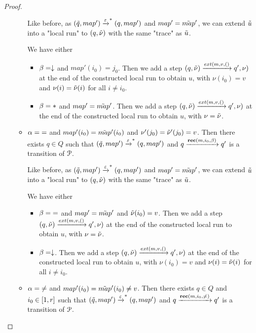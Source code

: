\begin{proof}
\begin{itemize}
\begin{itemize}
			Like before, as $(\Tilde{q}, map') \xrightarrow{\varepsilon}^* (q, map')$ and $map'=\Tilde{map}'$, we can extend $\Tilde{u}$ into a "local run" to $(q, \Tilde{\nu})$ with the same  "trace" as $\Tilde{u}$.
			
			We have either
			\begin{itemize}
				\item $\beta=\downarrow$ and $map'(i_0) = j_0$. Then we add a step $(q, \Tilde{\nu}) \extbr{m,v} (q', \nu)$ at the end of the constructed local run to obtain $u$, with $\nu(i_0)=v$ and $\nu(i) = \Tilde{\nu}(i)$ for all $i \neq i_0$.
				
				\item $\beta={*}$ and $map' = \Tilde{map}'$. Then we add a step $(q, \Tilde{\nu}) \extbr{m,v} (q', \nu)$ at the end of the constructed local run to obtain $u$, with $\nu = \Tilde{\nu}$.
			\end{itemize}
			
			\item $\alpha = {=}$ and $map'(i_0)=\Tilde{map}'(i_0)$ and $\nu'(j_0) = \Tilde{\nu}'(j_0) = v$. Then there exists $q \in Q$ such that $(\Tilde{q}, map') \xrightarrow{\varepsilon}^* (q, map')$ and $q \xrightarrow{\textbf{rec}(m, i_0, \beta)} q'$ is a transition of $\mathcal{P}$.
			
			Like before, as $(\Tilde{q}, map') \xrightarrow{\varepsilon}^* (q, map')$ and $map'=\Tilde{map}'$, we can extend $\Tilde{u}$ into a "local run" to $(q, \Tilde{\nu})$ with the same  "trace" as $\Tilde{u}$.
			
			We have either
			\begin{itemize}
				\item $\beta={=}$ and $map' = \Tilde{map}'$ and $\Tilde{\nu}(i_0) = v$. Then we add a step $(q, \Tilde{\nu}) \extbr{m,v} (q', \nu)$ at the end of the constructed local run to obtain $u$, with $\nu = \Tilde{\nu}$.
				
				\item $\beta=\downarrow$. Then we add a step $(q, \Tilde{\nu}) \extbr{m,v} (q', \nu)$ at the end of the constructed local run to obtain $u$, with $\nu(i_0) = v$ and $\nu(i)=\Tilde{\nu}(i)$ for all $i \neq i_0$.
			\end{itemize}
			
			\item $\alpha = {\ne}$ and $map'(i_0)=\Tilde{map}'(i_0) \neq v$. Then there exists $q \in Q$ and $i_0 \in [1,r]$ such that $(\Tilde{q}, map') \xrightarrow{\varepsilon}^* (q, map')$ and $q \xrightarrow{\textbf{rec}(m, i_0, {\ne})} q'$ is a transition of $\mathcal{P}$.
			

\end{itemize}
\end{itemize}
\end{proof}
